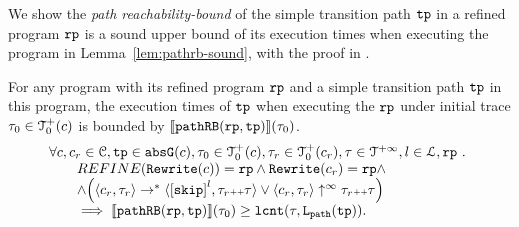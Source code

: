 We show the \emph{path reachability-bound} of the simple transition path $\mathtt{tp}$ in a refined program $\mathtt{rp}$ is a sound upper bound of its execution times when executing the program in Lemma~\ref{lem:pathrb-sound}, with the proof in .
\begin{lem}
  \label{lem:pathrb-sound}
  For any program with its refined program $\mathtt{rp}$ and a simple transition path $\mathtt{tp}$ in this program,
  the execution times of $\mathtt{tp}$ when executing the $\mathtt{rp}$ under initial trace $\mathtt{\tau}_0 \in \mathcal{T}^{+}_0(c)$ is bounded by $\llbracket \mathtt{pathRB}(\mathtt{rp}, \mathtt{tp}) \rrbracket(\mathtt{\tau}_0)$.
  \[
    \begin{array}{l}
    \forall c, c_r \in \cdom, \tpath \in \absG(c), \trace_0 \in \ftdom_0(c),  \trace_r \in \ftdom_0(c_r), \trace \in \tdom, l \in \ldom, \rprog \st 
    \\ \qquad
    REFINE(\algrewrite(c)) = \rprog
    \land 
    \algrewrite(c_r) = \rprog
    \land
    \\ \qquad
    \land 
    \Big(
      \config{c_r, \trace_r} \rightarrow^* \config{\clabel{\eskip}^{l}, \trace_r \tracecat \trace}
      \lor \config{c_r, \trace_r} \uparrow^{\infty} \trace_r \tracecat \trace 
      \Big)
  \\ \qquad
    \implies
    \econfig{\inoutB(\rprog, \tpath)}(\trace_0) \geq \lcounter(\trace, \pathl(\tpath)).
    \end{array}
  \]  
\end{lem}

